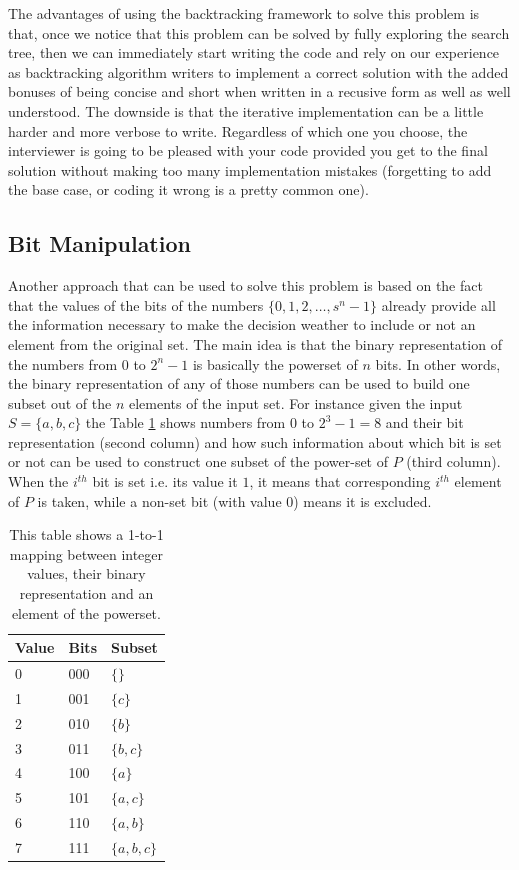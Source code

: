 The advantages of using the backtracking framework to solve this problem is that, once we notice
that this problem can be solved by fully exploring the search tree, then we can immediately
start writing the code and rely on our experience as backtracking algorithm writers to implement a correct
solution with the added bonuses of being concise and short when written in a recusive form  as well
as well understood.
The downside is that the iterative implementation can be a little harder and more verbose to write.
Regardless of which one you choose, the interviewer is going to be pleased with your code provided you get to the final solution
without making too many implementation mistakes (forgetting to add the base case, or coding it wrong
is a pretty common one).

\subsection{Bit Manipulation}
Another approach that can be used to solve this problem is based on the fact that the values of the
bits of the numbers $\{0,1,2,\ldots, s^n-1\}$  already provide all the information necessary to make
the decision weather to include or not an element from the original set. 
The main idea is that the binary representation of the numbers from $0$ to $2^{n}-1$ is basically
the powerset of $n$ bits.
In other words, the binary representation of any of those numbers can be used to build one subset out
of the $n$ elements of the input set. 
For instance given the input $S=\{a,b,c\}$ the Table \ref{tab:mapping_value_bits} shows numbers from $0$ to $2^3-1 = 8$ and their bit
representation (second column) and how such information about which bit is set or not can be used to construct one
subset of the power-set of $P$ (third column). When the $i^{th}$ bit is set i.e. its value it $1$, it means that
corresponding $i^{th}$ element of $P$ is taken, while a non-set bit (with value $0$) means it is
excluded.

\begin{table}
	\centering
	\begin{tabular}{|l|l|l|}
		\hline
		Value & Bits & Subset\\ \hline
		0     & 000  & $\{\}$\\ \hline
		1     & 001  & $\{c\}$\\ \hline
		2     & 010  & $\{b\}$\\ \hline
		3     & 011  & $\{b,c\}$\\ \hline
		4     & 100  & $\{a\}$\\ \hline
		5     & 101  & $\{a,c\}$\\ \hline
		6     & 110  & $\{a,b\}$\\ \hline
		7     & 111  & $\{a,b,c\}$ \\ \hline
	\end{tabular}
	\caption[Mapping between bits and element of the powerset.]{This table shows a 1-to-1 mapping between integer values, their binary representation and an element of the powerset.}
	\label{tab:mapping_value_bits}
\end{table}

